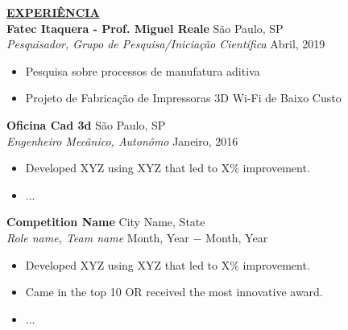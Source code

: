\documentclass{article}
\begin{document}
% 
%
\noindent \textbf{\underline{EXPERIÊNCIA}} \\
\noindent \textbf{Fatec Itaquera - Prof. Miguel Reale} \hfill São Paulo, SP \\
\textit{Pesquisador, Grupo de Pesquisa/Iniciação Científica} \hfill Abril, 2019 
\begin{itemize}[noitemsep,nolistsep,leftmargin=*]
\item {Pesquisa sobre processos de manufatura aditiva}
\item {Projeto de Fabricação de Impressoras 3D Wi-Fi de Baixo Custo}\\
\end{itemize}

\noindent \textbf{Oficina Cad 3d} \hfill São Paulo, SP \\
\textit{Engenheiro Mecânico, Autonômo} \hfill Janeiro, 2016
\begin{itemize}[noitemsep,nolistsep,leftmargin=*]
\item {Developed XYZ using XYZ that led to X\% improvement.}
\item {... \\}
\end{itemize}

\noindent \textbf{Competition Name} \hfill City Name, State \\
\textit{Role name, Team name} \hfill Month, Year $-$ Month, Year
\begin{itemize}[noitemsep,nolistsep,leftmargin=*]
\item {Developed XYZ using XYZ that led to X\% improvement.}
\item{Came in the top 10 OR received the most innovative award.}
\item {... \\}
\end{itemize}
\end{document}
